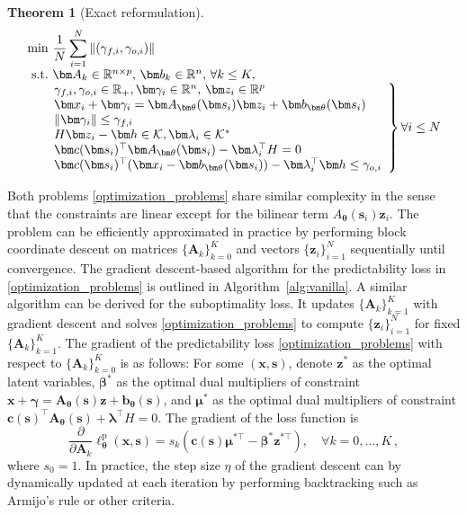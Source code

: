 \documentclass{article}
\theoremstyle{plain}
\newtheorem{theorem}{Theorem}[section]
\begin{document}
\begin{theorem}[Exact reformulation]
\begin{subequations}
    \begin{equation}\label{suboptimality_problem}
         \begin{array}{@{}r@{~}l@{}l}
    \min   & \displaystyle\frac{1}{N} \sum_{i = 1}^N \|(\gamma_{f,i},\gamma_{o,i})\|\\
    \textnormal{s.t.}      &\bm A_k\in\mathbb{R}^{n\times p},\, \bm b_k\in\mathbb{R}^{n},\, \forall k\leq K,\\
    &\left.
    \!\!\!\begin{array}{l}
    \gamma_{f,i},\gamma_{o,i}\in\mathbb{R}_+, \bm\gamma_i\in\mathbb{R}^n,\,\bm z_i\in\mathbb{R}^p\\
    \bm x_i + \bm \gamma_{i} = \bm A_{\bm\theta}(\bm s_i)\bm z_i + \bm b_{\bm\theta}(\bm s_i)\\
    \|\bm \gamma_i\|\leq \gamma_{f,i}\\
     H\bm z_i - \bm h \in \mathcal{K}, \bm \lambda_i \in \mathcal K^*\\
    \bm c(\bm s_i)^\top\bm A_{\bm\theta}(\bm s_i) - \bm \lambda_i^\top H = 0 \\
     \bm c(\bm s_i)^\top(\bm x_i-\bm b_{\bm\theta}(\bm s_i)) - \bm \lambda_i^\top \bm h \leq \gamma_{o,i}
     \end{array}
    \right\} \forall i\leq N
    \end{array} 
    \end{equation}
\end{subequations}
\end{theorem}
Both problems \eqref{optimization_problems} share similar complexity in the sense that the constraints are linear except for the bilinear term $A_{\bm\theta}(\bm s_i)\bm z_i$. The problem can be efficiently approximated in practice by performing block coordinate descent \cite{MR3444832} on matrices $\{\bm A_k\}_{k=0}^K$ and vectors $\{\bm z_i\}_{i=1}^N$ sequentially until convergence. The gradient descent-based algorithm for the predictability loss in \eqref{optimization_problems} is outlined in Algorithm~\ref{alg:vanilla}. A similar algorithm can be derived for the suboptimality loss. It updates $\{\boldsymbol A_k\}_{k=1}^K$ with gradient descent and solves \eqref{optimization_problems} to compute $\{\bm z_i\}_{i=1}^N$ for fixed $\{\boldsymbol A_k\}_{k=1}^K$. The gradient of the predictability loss \eqref{optimization_problems} with respect to $\{\bm A_k\}_{k=0}^K$ is as follows: For some $(\bm x,\bm s)$, denote $\bm z^*$ as the optimal latent variables, $\bm \beta^*$ as the optimal dual multipliers of constraint $\bm x + \bm \gamma = \bm A_{\bm\theta}(\bm s)\bm z + \bm b_{\bm\theta}(\bm s)$, and $\bm \mu^*$ as the optimal dual multipliers of constraint $\bm c(\bm s)^\top\bm A_{\bm\theta}(\bm s) + \bm \lambda^\top H = 0$. The gradient of the loss function is  
\begin{equation}
    \frac{\partial}{\partial \bm A_k}\ell_{\bm\theta}^\text{p}(\bm x,\bm s) = s_k(\bm c(\bm s)\bm \mu^{*\top} - \bm \beta^*\bm z^{*\top}), \quad \forall k = 0,\ldots,K \,,
\end{equation}
where $s_0 = 1$.  
In practice, the step size  $\eta$ of the gradient descent  can by dynamically updated at each iteration by performing backtracking such as Armijo's rule or other criteria.  
\end{document}
